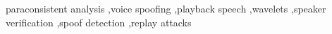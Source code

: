 paraconsistent analysis \sep voice spoofing \sep playback speech \sep wavelets \sep speaker verification \sep spoof detection \sep replay attacks